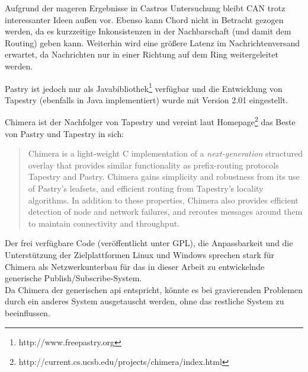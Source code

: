 
Aufgrund der mageren Ergebnisse in Castros Untersuchung \cite{Castro2003Evaluation} bleibt CAN trotz interessanter Ideen außen vor. Ebenso kann Chord nicht in Betracht gezogen werden, da es kurzzeitige Inkonsistenzen in der Nachbarschaft (und damit dem Routing) geben kann. Weiterhin wird eine größere Latenz im Nachrichtenversand erwartet, da Nachrichten nur in einer Richtung auf dem Ring weitergeleitet werden.

 Pastry ist jedoch nur als Javabibliothek\footnote{http://www.freepastry.org} verfügbar und die Entwicklung von Tapestry (ebenfalls in Java implementiert) wurde mit Version 2.01 eingestellt.

Chimera ist der Nachfolger von Tapestry und vereint laut Homepage\footnote{http://current.cs.ucsb.edu/projects/chimera/index.html} das Beste von Pastry und Tapestry in sich: 

\begin{quote}
Chimera is a light-weight C implementation of a \emph{next-generation} structured overlay that provides similar functionality as prefix-routing protocols Tapestry and Pastry.  Chimera gains simplicity and robustness from its use of Pastry's leafsets, and efficient routing from Tapestry's locality algorithms.  In addition to these properties, Chimera also provides efficient detection of node and network failures, and reroutes messages around them to maintain connectivity and throughput.  
\end{quote}

Der frei verfügbare Code (veröffentlicht unter GPL), die Anpassbarkeit und die Unterstützung der Zielplattformen Linux und Windows sprechen stark für Chimera als Netzwerkunterbau für das in dieser Arbeit zu entwickelnde generische Publish/Subscribe-System.\\
Da Chimera der generischen \ac{api} entspricht, könnte es bei gravierenden Problemen durch ein anderes System ausgetauscht werden, ohne das restliche System zu beeinflussen.
